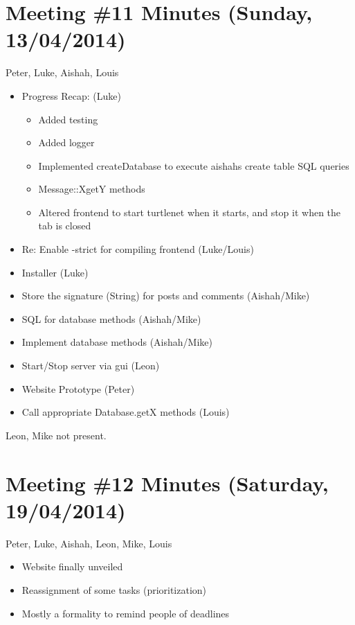 \section{Meeting \#11 Minutes (Sunday, 13/04/2014)}
Peter, Luke, Aishah, Louis
\begin{itemize}
\item Progress Recap: (Luke)
    \begin{itemize}
    \item Added testing
    \item Added logger
    \item Implemented createDatabase to execute aishahs create table SQL queries
    \item Message::XgetY methods
    \item Altered frontend to start turtlenet when it starts, and stop it when the tab is closed
    \end{itemize}
\item Re: Enable -strict for compiling frontend (Luke/Louis)
\item Installer (Luke)
\item Store the signature (String) for posts and comments (Aishah/Mike)
\item SQL for database methods (Aishah/Mike)
\item Implement database methods (Aishah/Mike)
\item Start/Stop server via gui (Leon)
\item Website Prototype (Peter)
\item Call appropriate Database.getX methods (Louis)
\end{itemize}
Leon, Mike not present.

\section{Meeting \#12 Minutes (Saturday, 19/04/2014)}
Peter, Luke, Aishah, Leon, Mike, Louis
\begin{itemize}
\item Website finally unveiled
\item Reassignment of some tasks (prioritization)
\item Mostly a formality to remind people of deadlines
\end{itemize}


